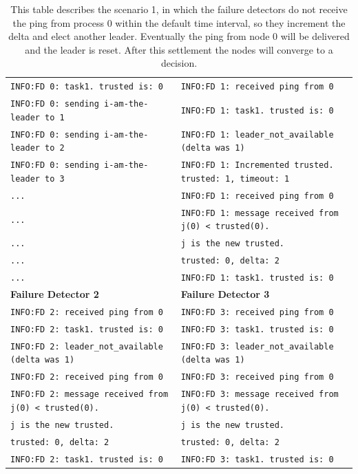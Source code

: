 \documentclass[a4paper]{article}
\begin{document}
\begin{compactitem}
\begin{table}[H]
\begin{tabular}{ll}
		\midrule
		\verb|INFO:FD 0: task1. trusted is: 0| & \verb|INFO:FD 1: received ping from 0| \\
		\verb|INFO:FD 0: sending i-am-the-leader to 1| & \verb|INFO:FD 1: task1. trusted is: 0| \\
		\verb|INFO:FD 0: sending i-am-the-leader to 2| & \verb|INFO:FD 1: leader_not_available (delta was 1)| \\
		\verb|INFO:FD 0: sending i-am-the-leader to 3| & \verb|INFO:FD 1: Incremented trusted. trusted: 1, timeout: 1| \\
		\verb|...| & \verb|INFO:FD 1: received ping from 0| \\
		\verb|...| & \verb|INFO:FD 1: message received from j(0) < trusted(0).| \\
		\verb|...| & \hspace{16pt}\verb|j is the new trusted.| \\
		\verb|...| & \verb|trusted: 0, delta: 2| \\
		\verb|...| & \verb|INFO:FD 1: task1. trusted is: 0| \\
        \midrule
		\textbf{Failure Detector 2} & \textbf{Failure Detector 3} \\
		\midrule
        \verb|INFO:FD 2: received ping from 0| & \verb|INFO:FD 3: received ping from 0| \\
		\verb|INFO:FD 2: task1. trusted is: 0| & \verb|INFO:FD 3: task1. trusted is: 0| \\
		\verb|INFO:FD 2: leader_not_available (delta was 1)| & \verb|INFO:FD 3: leader_not_available (delta was 1)| \\
		\verb|INFO:FD 2: received ping from 0| & \verb|INFO:FD 3: received ping from 0| \\
		\verb|INFO:FD 2: message received from j(0) < trusted(0).| & \verb|INFO:FD 3: message received from j(0) < trusted(0).| \\
		\hspace{16pt}\verb|j is the new trusted.| & \hspace{16pt}\verb|j is the new trusted.| \\
		\verb|trusted: 0, delta: 2| & \verb|trusted: 0, delta: 2| \\
		\verb|INFO:FD 2: task1. trusted is: 0| & \verb|INFO:FD 3: task1. trusted is: 0| \\
        \bottomrule
        \end{tabular}
        \caption{\small{This table describes the scenario 1, in which the failure detectors do not receive the ping from process $0$ within the default time interval, so they increment the delta and elect another leader. Eventually the ping from node $0$ will be delivered and the leader is reset. After this settlement the nodes will converge to a decision. }}
        \label{table:scenario1}
	\end{table}


\end{compactitem}
\end{document}
